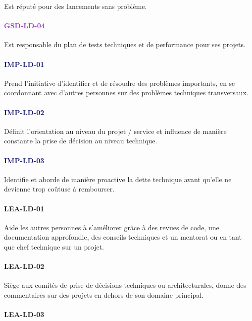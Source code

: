 \documentclass[a4paper, french, openany, 12pt]{book}
\newcommand\str[1]{\textcolor{DarkOrchid}{\textbf{\uppercase{gsd-{#1}}}}}
\newcommand\wis[1]{\textcolor{MidnightBlue}{\textbf{\uppercase{imp-{#1}}}}}
\newcommand\cha[1]{\textcolor{OliveGreen}{\textbf{\uppercase{lea-{#1}}}}}
\begin{document}
\begin{multicols}{2}
  Est réputé pour des lancements sans problème.

  \paragraph*{\str{ld-04}}

  Est responsable du plan de tests techniques et de performance pour ses projets.

  \paragraph*{\wis{ld-01}}

  Prend l'initiative d'identifier et de résoudre des problèmes importants, en se coordonnant avec d'autres personnes sur
  des problèmes techniques transversaux.

  \paragraph*{\wis{ld-02}}

  Définit l'orientation au niveau du projet / service et influence de manière constante la prise de décision au niveau
  technique.
  \paragraph*{\wis{ld-03}}

  Identifie et aborde de manière proactive la dette technique avant qu'elle ne devienne trop coûtuse à rembourser.

  \paragraph*{\cha{ld-01}}

  Aide les autres personnes à s'améliorer grâce à des revues de code, une documentation approfondie, des conseils 
  techniques et un mentorat ou en tant que chef technique sur un projet.

  \paragraph*{\cha{ld-02}}

  Siège aux comités de prise de décisions techniques ou architecturales, donne des commentaires sur des projets en dehors 
  de son domaine principal.
  
  \paragraph*{\cha{ld-03}}


\end{multicols}
\end{document}
